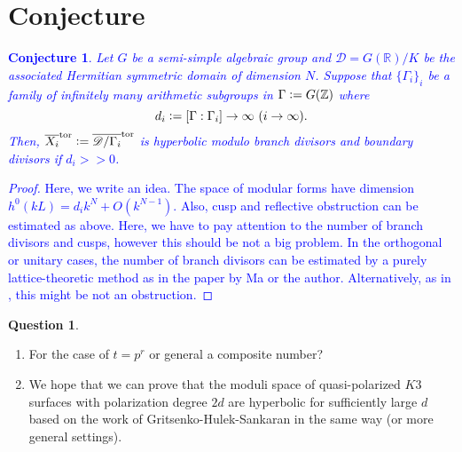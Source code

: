 \documentclass[12pt, pdftex]{amsart}
\theoremstyle{plain}
\newtheorem{conj}[thm]{Conjecture}
\theoremstyle{definition}
\newtheorem{que}[thm]{Question}
\numberwithin{equation}{section}
\def\R{{\mathbb R}}
\def\Z{{\mathbb Z}}
\def\tor{\mathrm{tor}}
\def\D{\mathscr{D}}
\newcommand{\defeq}{\vcentcolon=}
\begin{document}
\section{Conjecture}
\textcolor{blue}{\begin{conj}
Let $G$ be a semi-simple algebraic group and $\D=G(\R)/K$ be the associated Hermitian symmetric domain of dimension $N$.
Suppose that $\{\Gamma_i\}_i$ be a family of infinitely many arithmetic subgroups in $\Gamma\defeq G(\Z)$ where 
\[d_i\defeq [\Gamma : \Gamma_i]\to\infty\ (i\to\infty).\]
Then, $\overline{X_i}^{\tor}\defeq \overline{\D/\Gamma_i}^{\tor}$ is hyperbolic modulo branch divisors and boundary divisors if $d_i>>0$.
\end{conj}
\begin{proof}
Here, we write an idea.
The space of modular forms have dimension $h^0(kL)=d_ik^N+O(k^{N-1})$.
Also, cusp and reflective obstruction can be estimated as above.
Here, we have to pay attention to the number of branch divisors and cusps, however this should be not a big problem.
In the orthogonal or unitary cases, the number of branch divisors can be estimated by a purely lattice-theoretic method as in the paper by Ma or the author.
Alternatively, as in \cite[Corollary 4.7, Theorem 4.19]{HS94}, this might be not an obstruction.
\end{proof}}

\begin{que}
\begin{enumerate}
\item For the case of $t=p^r$ or general a composite number?
\item We hope that we can prove that the moduli space of quasi-polarized $K3$ surfaces with polarization degree $2d$ are hyperbolic for sufficiently large $d$ based on the work of Gritsenko-Hulek-Sankaran in the same way (or more general settings).
\end{enumerate}
\end{que}
\end{document}
